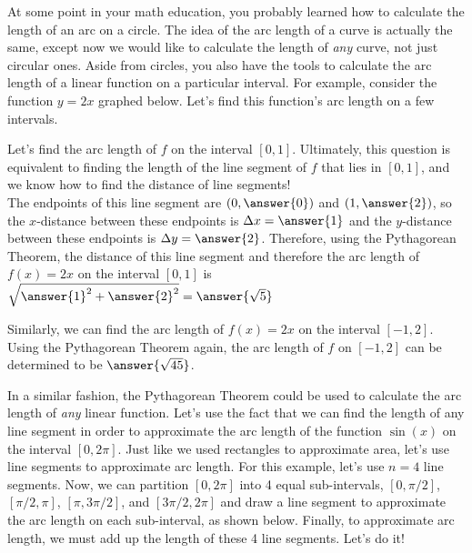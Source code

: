 \documentclass[handout,nooutcomes]{ximera}
\begin{document}
At some point in your math education, you probably learned how to calculate the length of an arc on a circle.  The idea of the arc length of a curve is actually the same, except now we would like to calculate the length of \textit{any} curve, not just circular ones.  Aside from circles, you also have the tools to calculate the arc length of a linear function on a particular interval.  For example, consider the function $y = 2x$ graphed below.  Let's find this function's arc length on a few intervals.

\begin{problem}
Let's find the arc length of $f$ on the interval $[0,1]$.  Ultimately, this question is equivalent to finding the length of the line segment of $f$ that lies in $[0,1]$, and we know how to find the distance of line segments!  \\

The endpoints of this line segment are $(0,\answer{0})$ and $(1,\answer{2})$, so the $x$-distance between these endpoints is $\Delta x = \answer{1}$ and the $y$-distance between these endpoints is $\Delta y = \answer{2}$.  Therefore, using the Pythagorean Theorem, the distance of this line segment and therefore the arc length of $f(x) = 2x$ on the interval $[0,1]$ is $\sqrt{\answer{1}^2+\answer{2}^2} = \answer{\sqrt{5}}$
\end{problem}

\begin{problem}
Similarly, we can find the arc length of $f(x)=2x$ on the interval $[-1,2]$.  Using the Pythagorean Theorem again, the arc length of $f$ on $[-1,2]$ can be determined to be $\answer{\sqrt{45}}$.
\end{problem}

In a similar fashion, the Pythagorean Theorem could be used to calculate the arc length of \textit{any} linear function.  Let's use the fact that we can find the length of any line segment in order to approximate the arc length of the function $\sin(x)$ on the interval $[0, 2\pi]$.  Just like we used rectangles to approximate area, let's use line segments to approximate arc length.  For this example, let's use $n=4$ line segments.  Now, we can partition $[0, 2\pi]$ into 4 equal sub-intervals, $[0, \pi/2]$, $[\pi/2, \pi]$, $[\pi, 3\pi/2]$, and $[3\pi/2, 2\pi]$ and draw a line segment to approximate the arc length on each sub-interval, as shown below.  Finally, to approximate arc length, we must add up the length of these 4 line segments.  Let's do it! \\
\end{document}
